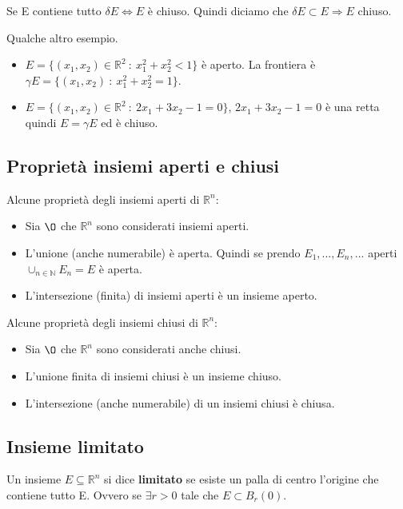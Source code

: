 \begin{theorem}
Se E contiene tutto $\delta E \Longleftrightarrow E$ è chiuso. Quindi diciamo che $\delta E \subset E \Longrightarrow E$ chiuso.
\end{theorem}

\begin{example}
Qualche altro esempio.
\begin{itemize}
    \item $E= \{(x_1, x_2) \in \mathbb{R}^2 \::\: x_1^2 + x_2^2 < 1\}$ è aperto. La frontiera è $\gamma E = \{(x_1, x_2) \::\: x_1^2 + x_2^2 = 1\}$.
    \item $E= \{(x_1, x_2) \in \mathbb{R}^2 \::\: 2x_1 + 3x_2 -1 = 0\}$, $2x_1 + 3x_2 -1 = 0$ è una retta quindi $E = \gamma E$ ed è chiuso.
\end{itemize}
\end{example}

\subsection{Proprietà insiemi aperti e chiusi}
Alcune proprietà degli insiemi aperti di $\mathbb{R}^n$:
\begin{itemize}
    \item Sia $\O$ che $\mathbb{R}^n$ sono considerati insiemi aperti.
    \item L'unione (anche numerabile) è aperta. Quindi se prendo $E_1, ..., E_n, ...$ aperti $\cup_{n \in \mathbb{N}}E_n = E$ è aperta.
    \item L'intersezione (finita) di insiemi aperti è un insieme aperto.
\end{itemize}
Alcune proprietà degli insiemi chiusi di $\mathbb{R}^n$:
\begin{itemize}
    \item Sia $\O$ che $\mathbb{R}^n$ sono considerati anche chiusi.
    \item L'unione finita di insiemi chiusi è un insieme chiuso.
    \item L'intersezione (anche numerabile) di un insiemi chiusi è chiusa.
\end{itemize}

\subsection{Insieme limitato}
\begin{definition}
Un insieme $E \subseteq \mathbb{R}^n$ si dice \textbf{limitato} se esiste un palla di centro l'origine che contiene tutto E. Ovvero se $\exists r > 0$ tale che $E \subset B_r(0)$.
\end{definition}

